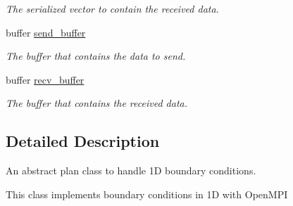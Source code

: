 \begin{DoxyCompactItemize}
\begin{DoxyCompactList}\small\item\em The serialized vector to contain the received data. \end{DoxyCompactList}\item 
\hypertarget{classone__d_1_1link__boundary_ad078cb1c9c97960e563d2eca686304ca}{buffer \hyperlink{classone__d_1_1link__boundary_ad078cb1c9c97960e563d2eca686304ca}{send\-\_\-buffer}}\label{classone__d_1_1link__boundary_ad078cb1c9c97960e563d2eca686304ca}

\begin{DoxyCompactList}\small\item\em The buffer that contains the data to send. \end{DoxyCompactList}\item 
\hypertarget{classone__d_1_1link__boundary_a2789e5216b3751a4a51b2f1adc5ea1e6}{buffer \hyperlink{classone__d_1_1link__boundary_a2789e5216b3751a4a51b2f1adc5ea1e6}{recv\-\_\-buffer}}\label{classone__d_1_1link__boundary_a2789e5216b3751a4a51b2f1adc5ea1e6}

\begin{DoxyCompactList}\small\item\em The buffer that contains the received data. \end{DoxyCompactList}\end{DoxyCompactItemize}


\subsection{Detailed Description}
An abstract plan class to handle 1\-D boundary conditions. 



 This class implements boundary conditions in 1\-D with Open\-M\-P\-I 

